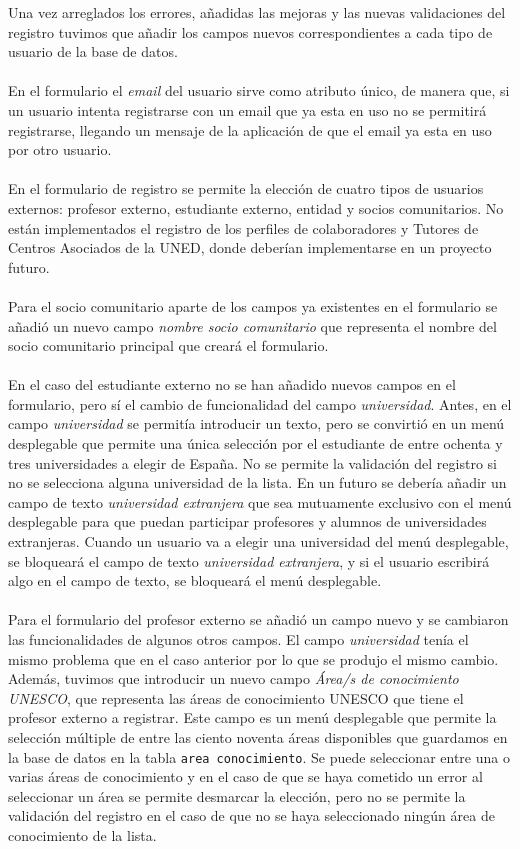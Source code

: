 \documentclass[11pt]{book}
\begin{document}
Una vez arreglados los errores, añadidas las mejoras y las nuevas validaciones del registro tuvimos que añadir los campos nuevos correspondientes a cada tipo de usuario de la base de datos. \\\\
En el formulario el \emph{email} del usuario sirve como atributo único, de manera que, si un usuario intenta registrarse con un email que ya esta en uso no se permitirá registrarse, llegando un mensaje de la aplicación de que el email ya esta en uso por otro usuario. \\\\
En el formulario de registro se permite la elección de cuatro tipos de usuarios externos: profesor externo, estudiante externo, entidad y socios comunitarios. No están implementados el registro de los perfiles de colaboradores y Tutores de Centros Asociados de la UNED, donde deberían implementarse en un proyecto futuro.\\\\
Para el socio comunitario aparte de los campos ya existentes en el formulario se añadió un nuevo campo \emph{nombre socio comunitario} que representa el nombre del socio comunitario principal que creará el formulario.\\\\
En el caso del estudiante externo no se han añadido nuevos campos en el formulario, pero sí el cambio de funcionalidad del campo \emph{universidad}. Antes, en el campo \emph{universidad} se permitía introducir un texto, pero se convirtió en un menú desplegable que permite una única selección por el estudiante de entre ochenta y tres universidades a elegir de España. No se permite la validación del registro si no se selecciona alguna universidad de la lista. En un futuro se debería añadir un campo de texto \emph{universidad extranjera} que sea mutuamente exclusivo con el menú desplegable para que puedan participar profesores y alumnos de universidades extranjeras. Cuando un usuario va a elegir una universidad del menú desplegable, se bloqueará el campo de texto \emph{universidad extranjera}, y si el usuario escribirá algo en el campo de texto, se bloqueará el menú desplegable. \\\\
Para el formulario del profesor externo se añadió un campo nuevo y se cambiaron las funcionalidades de algunos otros campos. El campo \emph{universidad} tenía el mismo problema que en el caso anterior por lo que se produjo el mismo cambio. Además, tuvimos que introducir un nuevo campo \emph{Área/s de conocimiento UNESCO}, que representa las áreas de conocimiento UNESCO que tiene el profesor externo a registrar. Este campo es un menú desplegable que permite la selección múltiple de entre las ciento noventa áreas disponibles que guardamos en la base de datos en la tabla \texttt{area conocimiento}. Se puede seleccionar entre una o varias áreas de conocimiento y en el caso de que se haya cometido un error al seleccionar un área se permite desmarcar la elección, pero no se permite la validación del registro en el caso de que no se haya seleccionado ningún área de conocimiento de la lista.\\\\
\end{document}
